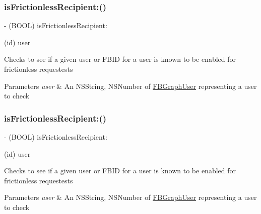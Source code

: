 \subsubsection{\texorpdfstring{is\+Frictionless\+Recipient\+:()}{isFrictionlessRecipient:()}\hspace{0.1cm}{\footnotesize\ttfamily [3/5]}}
{\footnotesize\ttfamily -\/ (B\+O\+OL) is\+Frictionless\+Recipient\+: \begin{DoxyParamCaption}\item[{(id)}]{user }\end{DoxyParamCaption}}

Checks to see if a given user or F\+B\+ID for a user is known to be enabled for frictionless requestests


\begin{DoxyParams}{Parameters}
{\em user} & An N\+S\+String, N\+S\+Number of {\ttfamily \hyperlink{protocolFBGraphUser-p}{F\+B\+Graph\+User}} representing a user to check \\
\hline
\end{DoxyParams}
\mbox{\label{interfaceFBFrictionlessRecipientCache_a9d03bd8dd9a235086cab18ab45b143cd}} 
\subsubsection{\texorpdfstring{is\+Frictionless\+Recipient\+:()}{isFrictionlessRecipient:()}\hspace{0.1cm}{\footnotesize\ttfamily [4/5]}}
{\footnotesize\ttfamily -\/ (B\+O\+OL) is\+Frictionless\+Recipient\+: \begin{DoxyParamCaption}\item[{(id)}]{user }\end{DoxyParamCaption}}

Checks to see if a given user or F\+B\+ID for a user is known to be enabled for frictionless requestests


\begin{DoxyParams}{Parameters}
{\em user} & An N\+S\+String, N\+S\+Number of {\ttfamily \hyperlink{protocolFBGraphUser-p}{F\+B\+Graph\+User}} representing a user to check \\
\hline
\end{DoxyParams}
\mbox{\label{interfaceFBFrictionlessRecipientCache_a9d03bd8dd9a235086cab18ab45b143cd}} 

